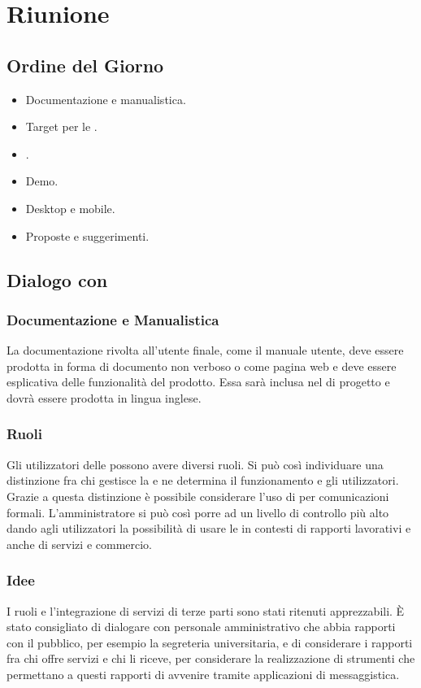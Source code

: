 \section{Riunione}
\subsection{Ordine del Giorno}
\begin{itemize}
	\item Documentazione e manualistica.
	\item Target per le .
	\item {}.
	\item Demo.
	\item Desktop e mobile.
	\item Proposte e suggerimenti.
\end{itemize}

\subsection{Dialogo con \Proponente}
\subsubsection{Documentazione e Manualistica}
La documentazione rivolta all'utente finale, come il manuale utente, deve  essere prodotta in forma di documento non verboso o come pagina web e deve essere esplicativa delle funzionalità del prodotto. 
Essa sarà inclusa nel  di progetto e dovrà essere prodotta in lingua inglese.

\subsubsection{Ruoli}
Gli utilizzatori delle  possono avere diversi ruoli. Si può così individuare una distinzione fra chi gestisce la  e ne determina il funzionamento e gli utilizzatori.
Grazie a questa distinzione è possibile considerare l'uso di  per comunicazioni formali. 
L'amministratore si può così porre ad un livello di controllo più alto dando agli utilizzatori la possibilità di usare le  in contesti di rapporti lavorativi e anche di servizi e commercio.

\subsubsection{Idee}
I ruoli e l'integrazione di servizi di terze parti sono stati ritenuti apprezzabili.
\`{E} stato consigliato di dialogare con personale amministrativo che abbia rapporti con il pubblico, per esempio la segreteria universitaria, e di considerare i rapporti fra chi offre servizi e chi li riceve, per considerare la realizzazione di strumenti che permettano a questi rapporti di avvenire tramite applicazioni di messaggistica.  

